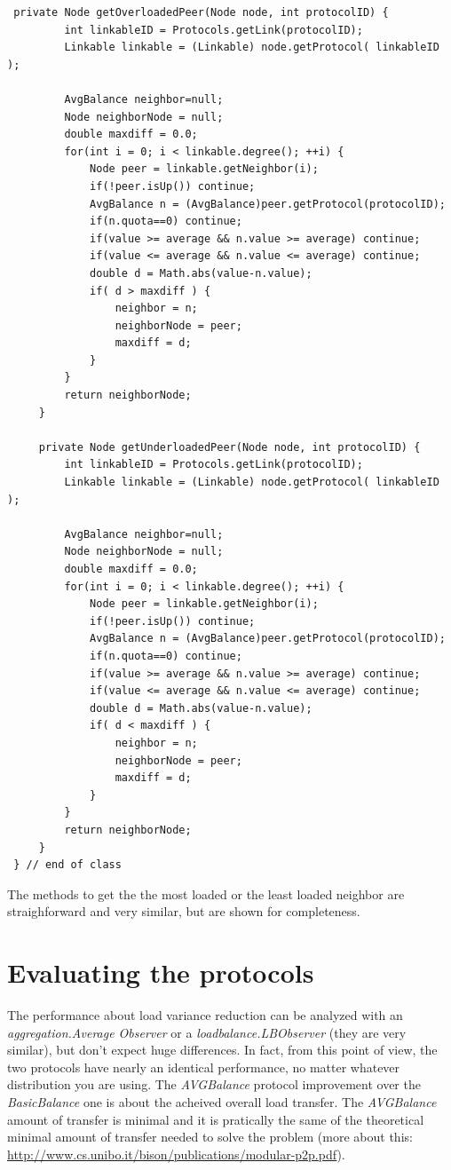 \documentclass[a4paper,11pt]{article}
\begin{document}
\footnotesize
\begin{verbatim}
 private Node getOverloadedPeer(Node node, int protocolID) {
         int linkableID = Protocols.getLink(protocolID);
         Linkable linkable = (Linkable) node.getProtocol( linkableID );
     
         AvgBalance neighbor=null;
         Node neighborNode = null;
         double maxdiff = 0.0;
         for(int i = 0; i < linkable.degree(); ++i) {
             Node peer = linkable.getNeighbor(i); 
             if(!peer.isUp()) continue;
             AvgBalance n = (AvgBalance)peer.getProtocol(protocolID);
             if(n.quota==0) continue;
             if(value >= average && n.value >= average) continue;
             if(value <= average && n.value <= average) continue;
             double d = Math.abs(value-n.value); 
             if( d > maxdiff ) {
                 neighbor = n;
                 neighborNode = peer;
                 maxdiff = d;
             }
         }
         return neighborNode;
     } 
 
     private Node getUnderloadedPeer(Node node, int protocolID) {
         int linkableID = Protocols.getLink(protocolID);
         Linkable linkable = (Linkable) node.getProtocol( linkableID );
     
         AvgBalance neighbor=null;
         Node neighborNode = null;
         double maxdiff = 0.0;
         for(int i = 0; i < linkable.degree(); ++i) {
             Node peer = linkable.getNeighbor(i);
             if(!peer.isUp()) continue;
             AvgBalance n = (AvgBalance)peer.getProtocol(protocolID);
             if(n.quota==0) continue;
             if(value >= average && n.value >= average) continue;
             if(value <= average && n.value <= average) continue;
             double d = Math.abs(value-n.value); 
             if( d < maxdiff ) {
                 neighbor = n;
                 neighborNode = peer;
                 maxdiff = d;
             }
         }
         return neighborNode;
     } 
 } // end of class
\end{verbatim}
\normalsize


The methods to get the the most loaded or the least loaded neighbor
are straighforward and very similar, but are shown for completeness.


\section{Evaluating the protocols}

The performance about load variance reduction can be analyzed with
an \emph{aggregation.Average Observer} or a \emph{loadbalance.LBObserver}
(they are very similar), but don't expect huge differences. In fact,
from this point of view, the two protocols have nearly an identical
performance, no matter whatever distribution you are using. The 
\emph{AVGBalance}
protocol improvement over the \emph{BasicBalance} one is about the
acheived overall load transfer. The \emph{AVGBalance} amount of transfer
is minimal and it is pratically the same of the theoretical minimal
amount of transfer needed to solve the problem 
(more about this: \url{http://www.cs.unibo.it/bison/publications/modular-p2p.pdf}). 
\end{document}
